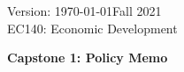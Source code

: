 \documentclass[11pt]{article}
\begin{document}
\thispagestyle{plain}
\singlespacing


Version: \today \hfill Fall 2021\\
EC140: Economic Development
\begin{center}
\Large{\textbf{Capstone 1: Policy Memo}}\\
\end{center}
\bigskip

%
%
%
%
%
%
\end{document}
